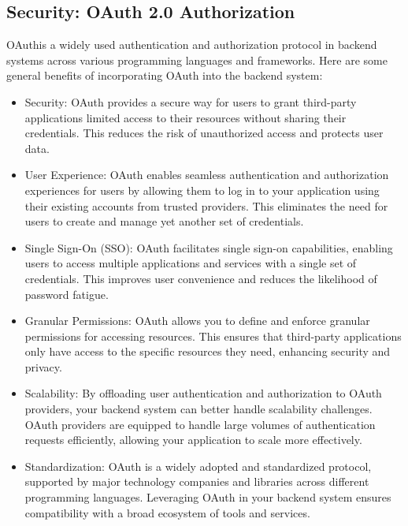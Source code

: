 \subsection{Security: OAuth 2.0 Authorization}

OAuthis a widely used authentication and authorization protocol in backend systems across various programming languages and frameworks. Here are some general benefits of incorporating OAuth into the backend system:

\begin{itemize}
    \item {Security:} OAuth provides a secure way for users to grant third-party applications limited access to their resources without sharing their credentials. This reduces the risk of unauthorized access and protects user data.

    \item {User Experience:} OAuth enables seamless authentication and authorization experiences for users by allowing them to log in to your application using their existing accounts from trusted providers. This eliminates the need for users to create and manage yet another set of credentials.

    \item {Single Sign-On (SSO):} OAuth facilitates single sign-on capabilities, enabling users to access multiple applications and services with a single set of credentials. This improves user convenience and reduces the likelihood of password fatigue.

    \item {Granular Permissions:} OAuth allows you to define and enforce granular permissions for accessing resources. This ensures that third-party applications only have access to the specific resources they need, enhancing security and privacy.

    \item {Scalability:} By offloading user authentication and authorization to OAuth providers, your backend system can better handle scalability challenges. OAuth providers are equipped to handle large volumes of authentication requests efficiently, allowing your application to scale more effectively.

    \item {Standardization:} OAuth is a widely adopted and standardized protocol, supported by major technology companies and libraries across different programming languages. Leveraging OAuth in your backend system ensures compatibility with a broad ecosystem of tools and services.


\end{itemize}
